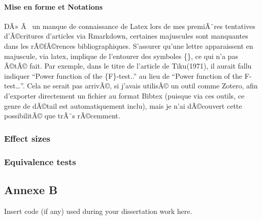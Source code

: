 \begin{appendix}
\hypertarget{mise-en-forme-et-notations-1}{%
\paragraph{Mise en forme et
Notations}\label{mise-en-forme-et-notations-1}}

DÃ» Ã~ un manque de connaissance de Latex lors de mes premiÃ¨res
tentatives d'Ã©critures d'articles via Rmarkdown, certaines majuscules
sont manquantes dans les rÃ©fÃ©rences bibliographiques. S'assurer qu'une
lettre apparaissent en majuscule, via latex, implique de l'entourer des
symboles \{\}, ce qui n'a pas Ã©tÃ© fait. Par exemple, dans le titre de
l'article de Tiku(1971), il aurait fallu indiquer ``Power function of
the \{F\}-test..'' au lieu de ``Power function of the F-test\ldots{}''.
Cela ne serait pas arrivÃ©, si j'avais utilisÃ© un outil comme Zotero,
afin d'exporter directement un fichier au format Bibtex (puisque via ces
outils, ce genre de dÃ©tail est automatiquement inclu), mais je n'ai
dÃ©couvert cette possibilitÃ© que trÃ¨s rÃ©cemment.

\hypertarget{effect-sizes}{%
\subsubsection{Effect sizes}\label{effect-sizes}}

\hypertarget{equivalence-tests}{%
\subsubsection{Equivalence tests}\label{equivalence-tests}}

\newpage

\hypertarget{annexe-b}{%
\subsection{Annexe B}\label{annexe-b}}

Insert code (if any) used during your dissertation work here.
\end{appendix}
